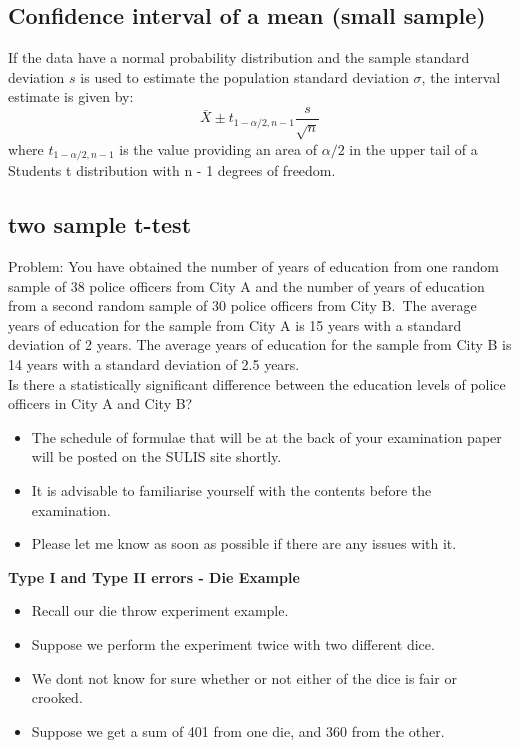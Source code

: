 {\subsection{Confidence interval of a mean (small sample)}

If the data have a normal probability distribution and the sample
standard deviation $s$ is used to estimate the population
standard deviation $\sigma$, the interval estimate is given by:
\begin{equation}
\bar{X} \pm t_{1-\alpha/2,n-1}\frac{s}{\sqrt{n}}
\end{equation}
where $t_{1-\alpha/2,n-1}$ is the value providing an area of $\alpha/2$ in the upper tail of a Students t distribution with n - 1 degrees of freedom.





\subsection{two sample t-test}
Problem: You have obtained the number of years of education from one random sample of 38 police 
officers from City A and the number of years of education from a second random sample of 30 police 
officers from City B.\ The average years of education for the sample from City A is 15 years with a 
standard deviation of 2 years. The average years of education for the sample from City B is 14 years with a standard deviation of 2.5 years. \\
Is there a statistically significant difference between the education levels of police officers in City A and City B?




\begin{itemize}
\item The schedule of formulae that will be at the back of your examination paper will be posted on the SULIS site shortly.
\item It is advisable to familiarise yourself with the contents before the examination.
\item Please let me know as soon as possible if there are any issues with it.
\end{itemize}




\textbf{Type I and Type II errors - Die Example}
\begin{itemize}
\item Recall our die throw experiment example. 
\item Suppose we perform the experiment twice with two different dice.
\item We dont not know for sure whether or not either of the dice is fair or crooked.
\item Suppose we get a sum of 401 from one die, and 360 from the other.
\end{itemize}

}
